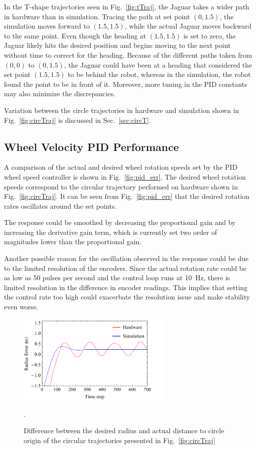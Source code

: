 \documentclass[conference]{../IEEEtran}
\begin{document}
In the T-shape trajectories seen in Fig.~\ref{fig:tTraj}, the Jaguar takes a wider path in
hardware than in simulation. Tracing the path at set point $(0,1.5)$, the simulation moves
forward to $(1.5,1.5)$, while the actual Jaguar moves backward to the same point. Even
though the heading at $(1.5,1.5)$ is set to zero, the Jaguar likely hits the desired
position and begins moving to the next point without time to correct for the heading.
Because of the different paths taken from $(0,0)$ to $(0,1.5)$, the Jaguar could have been
at a heading that considered the set point $(1.5, 1.5)$ to be behind the robot, whereas in
the simulation, the robot found the point to be in front of it. Moreover, more tuning in
the PID constants may also minimize the discrepancies.

Variation between the circle trajectories in hardware and simulation shown in
Fig.~\ref{fig:circTraj} is discussed in Sec.~\ref{sec:circT}.

\addtolength{\textheight}{-13.4cm}

\subsection{Wheel Velocity PID Performance} \label{sec:PIDtune}

A comparison of the actual and desired wheel rotation speeds set by the PID wheel speed
controller is shown in Fig.~\ref{fig:pid_err}.  The desired wheel rotation speeds
correspond to the circular trajectory performed on hardware shown in
Fig.~\ref{fig:circTraj}.  It can be seen from Fig.~\ref{fig:pid_err} that the desired
rotation rates oscillates around the set points.

The response could be smoothed by decreasing the proportional gain and by increasing the
derivative gain term, which is currently set two order of magnitudes lower than the
proportional gain.

Another possible reason for the oscillation observed in the response could be due to the
limited resolution of the encoders. Since the actual rotation rate could be as low as 50
pulses per second and the control loop runs at \SI{10}{\Hz}, there is limited resolution
in the difference in encoder readings. This implies that setting the control rate too high
could exacerbate the resolution issue and make stability even worse.

\begin{figure}[t]
\centering
\includegraphics[width=3in]{figures/circle_err.pdf}
\caption{Difference between the desired radius and actual distance to circle origin
         of the circular trajectories presented in Fig.~\ref{fig:circTraj}}.
\label{fig:circle_err}
\end{figure}
\end{document}
